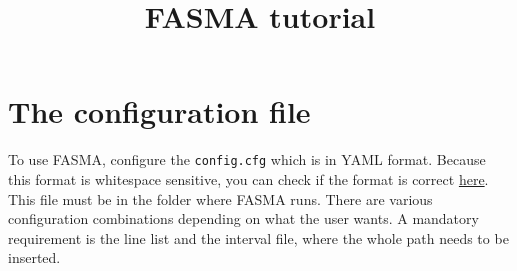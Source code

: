\documentclass[a4paper,12pt]{article}
\title{FASMA tutorial}
\author{}
\begin{document}
\maketitle


\section{The configuration file}

To use FASMA, configure the \texttt{config.cfg} which is in YAML format. Because this format is whitespace sensitive, you can check if the format is correct \href{http://www.yamllint.com/}{here}.
This file must be in the folder where FASMA runs. There are various configuration combinations depending on what the user wants. A mandatory requirement is the line list and the interval 
file, where the whole path needs to be inserted. 
\end{document}
